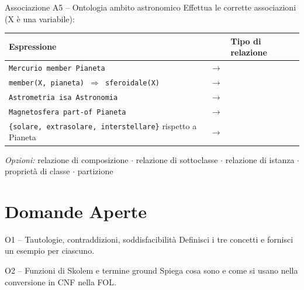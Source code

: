 \documentclass[12pt,a4paper]{article}
\begin{document}
\begin{assocbox}{Associazione A5 -- Ontologia ambito astronomico}
Effettua le corrette associazioni (X è una variabile):

\begin{center}
\renewcommand{\arraystretch}{1.5}
\begin{tabular}{lll}
\textbf{Espressione} & & \textbf{Tipo di relazione} \\
\hline
\texttt{Mercurio member Pianeta} & $\longrightarrow$ & \underline{\hspace{4cm}} \\
\texttt{member(X, pianeta) $\Rightarrow$ sferoidale(X)} & $\longrightarrow$ & \underline{\hspace{4cm}} \\
\texttt{Astrometria isa Astronomia} & $\longrightarrow$ & \underline{\hspace{4cm}} \\
\texttt{Magnetosfera part-of Pianeta} & $\longrightarrow$ & \underline{\hspace{4cm}} \\
\texttt{\{solare, extrasolare, interstellare\}} rispetto a Pianeta & $\longrightarrow$ & \underline{\hspace{4cm}} \\
\end{tabular}
\end{center}

\smallskip
\textit{Opzioni:} relazione di composizione $\cdot$ relazione di sottoclasse $\cdot$ relazione di istanza $\cdot$ proprietà di classe $\cdot$ partizione
\end{assocbox}

\newpage

\section{Domande Aperte}

\begin{domanda}{O1 -- Tautologie{,} contraddizioni{,} soddisfacibilità}
Definisci i tre concetti e fornisci un esempio per ciascuno.

\vspace{3cm}
\end{domanda}

\begin{domanda}{O2 -- Funzioni di Skolem e termine ground}
Spiega cosa sono e come si usano nella conversione in CNF nella FOL.

\vspace{3cm}
\end{domanda}
\end{document}
